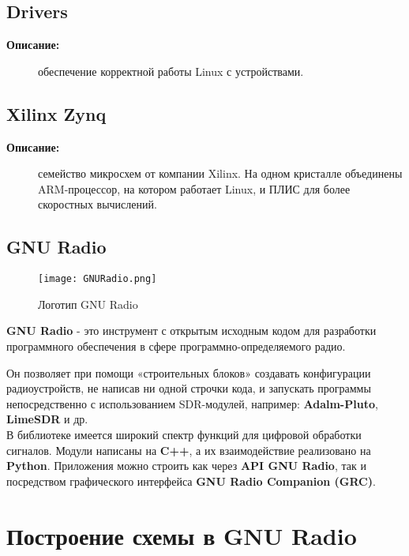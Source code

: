 \subsection*{\textbf{Drivers}}
\begin{description}
  \item[\textbf{Описание:}] обеспечение корректной работы Linux с устройствами.
\end{description}

\subsection*{\textbf{Xilinx Zynq}}
\begin{description}
  \item[\textbf{Описание:}] семейство микросхем от компании Xilinx. На одном кристалле 
  объединены ARM-процессор, на котором работает Linux, и ПЛИС для более скоростных вычислений. 
\end{description}


\subsection*{\textbf{GNU Radio}}

\begin{figure}[H]
    \centering
    \texttt{[image: GNURadio.png]}
    \caption{Логотип GNU Radio}
\end{figure}

\textbf{GNU Radio} - это инструмент с открытым исходным кодом для разработки программного обеспечения 
в сфере программно-определяемого радио. 

Он позволяет при помощи «строительных блоков» создавать конфигурации радиоустройств, не написав ни одной строчки кода, 
и запускать программы непосредственно с использованием SDR-модулей, например: \textbf{Adalm-Pluto}, \textbf{LimeSDR} и др. \\

В библиотеке имеется широкий спектр функций для цифровой обработки сигналов. Модули написаны на \textbf{C++}, 
а их взаимодействие реализовано на \textbf{Python}. Приложения можно строить как через \textbf{API GNU Radio}, 
так и посредством графического интерфейса \textbf{GNU Radio Companion (GRC)}.

\section*{\textbf{Построение схемы в GNU Radio}}

